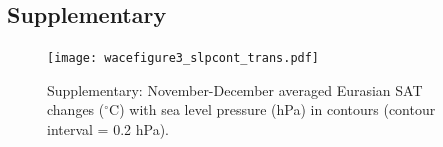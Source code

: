 \documentclass[grl]{AGUTeX}  %
\begin{document}
\begin{article}




\section{Supplementary}

\begin{figure}[t]
  \noindent\texttt{[image: wacefigure3\_slpcont\_trans.pdf]} \\ 
  \caption{Supplementary: November-December averaged Eurasian SAT changes ($^\circ$C) with sea level pressure (hPa) in contours (contour interval = 0.2 hPa).
}\label{fig:figsup1}
\end{figure} %




\end{article}
\end{document}
